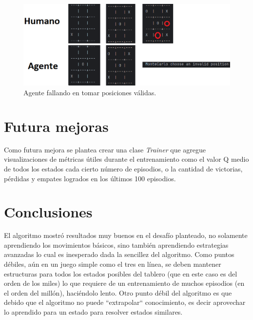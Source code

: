 \begin{figure}[htbp]
	\centering
	\includegraphics[width=\textwidth]{./Figures/monte_carlo_exception.png}
	\caption{Agente fallando en tomar posiciones válidas.}
	\label{fig:monte_carlo_exception}
\end{figure}

\section{Futura mejoras}

Como futura mejora se plantea crear una clase \textit{Trainer} que agregue visualizaciones de métricas útiles durante el entrenamiento como el valor Q medio de todos los estados cada cierto número de episodios, o la cantidad de victorias, pérdidas y empates logrados en los últimos 100 episodios.

\section{Conclusiones}

El algoritmo mostró resultados muy buenos en el desafío planteado, no solamente aprendiendo los movimientos básicos, sino también aprendiendo estrategias avanzadas lo cual es inesperado dada la sencillez del algoritmo. Como puntos débiles, aún en un juego simple como el tres en línea, se deben mantener estructuras para todos los estados posibles del tablero (que en este caso es del orden de los miles) lo que requiere de un entrenamiento de muchos episodios (en el orden del millón), haciéndolo lento. Otro punto débil del algoritmo es que debido que el algoritmo no puede ``extrapolar`` conocimiento, es decir aprovechar lo aprendido para un estado para resolver estados similares.